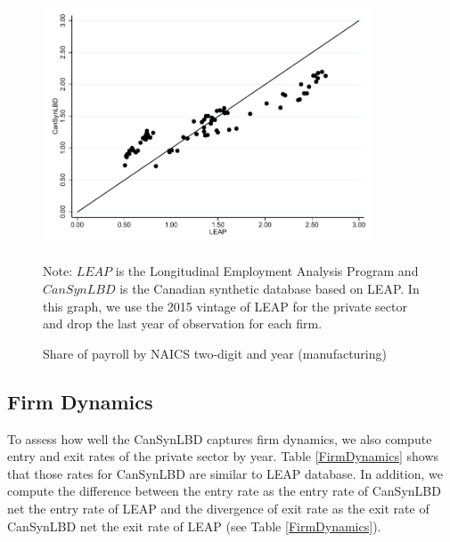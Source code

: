 \documentclass{article}
\begin{document}
\begin{figure} [H]
\centering
\caption{Share of payroll by NAICS two-digit and year (manufacturing)} \label{PayrollShareManufacturing}
\includegraphics[height=2.8in, width=.7\linewidth]{graphs/Share_of_payroll_by_NAICS_two-digit_and_year_Manufacturing_bw.pdf} 
\begin{minipage}{0.85\textwidth}
{\footnotesize Note: $LEAP$ is the Longitudinal Employment Analysis Program and $CanSynLBD$ is the Canadian synthetic database based on LEAP. In this graph, we use the 2015 vintage of LEAP for the private sector and drop the last year of observation for each firm. \par}
\end{minipage}
\end{figure}

\subsection{Firm Dynamics}
To assess how well the CanSynLBD captures firm dynamics, we also compute entry and exit rates of the private sector by year. Table \ref{FirmDynamics} shows that those rates for CanSynLBD are similar to LEAP database. In addition, we compute the difference between the entry rate as the entry rate of CanSynLBD net the entry rate of LEAP and the divergence of exit rate as the exit rate of CanSynLBD net the exit rate of LEAP (see Table \ref{FirmDynamics}).
\end{document}
